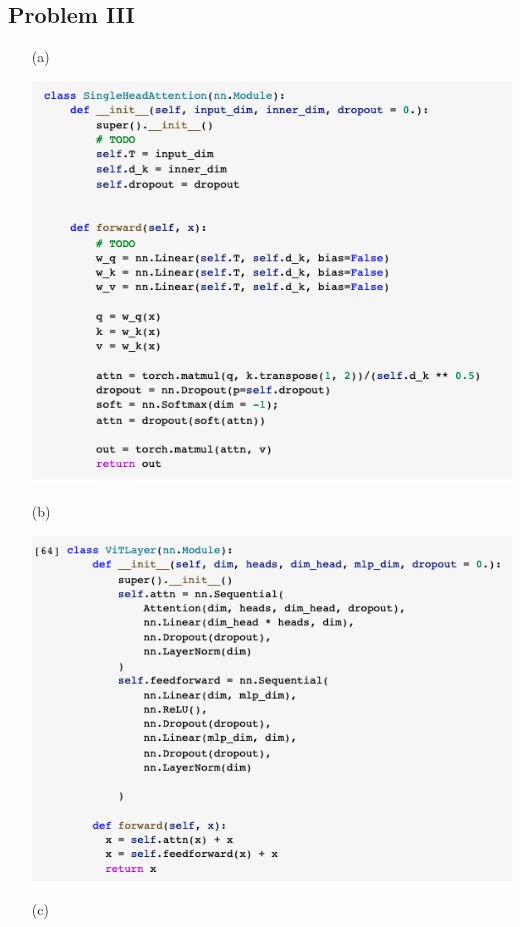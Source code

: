 \documentclass[11pt]{scrartcl}
\begin{document}
\subsection{Problem III}
\begin{itemize}
\item[(a)]\begin{center}
\includegraphics[scale=0.5]{single_head.png}
\end{center}
\item[(b)]
\begin{center}
\includegraphics[scale=0.5]{vitlayer.png}
\end{center}
\item[(c)]\begin{center}

\end{center}
\end{itemize}
\end{document}
